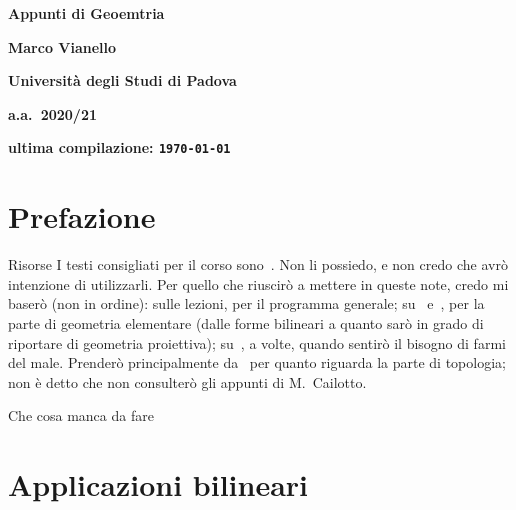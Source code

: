 \documentclass[a4paper]{amsproc}
\makeatletter
\theoremstyle{plain}
\theoremstyle{definition}
\theoremstyle{remark}
\def\paragraph{\@startsection{paragraph}{4}%
  \z@\z@{-\fontdimen2\font}%
  {\normalfont\bfseries}}
\makeatother
\begin{document}
\begin{titlepage}
  \centering
  \vfill
  {\Large\bfseries Appunti di Geoemtria\par}
  \vspace{.6cm}
  {\bfseries Marco Vianello\par}
  \vspace{.2cm}
  {\bfseries Università degli Studi di Padova\par}
  \vspace{.2cm}
  {\bfseries a.a.\ 2020/21\par}
  \vfill
  {\small\bfseries ultima compilazione: \texttt{\today}\par}
\end{titlepage}


\tableofcontents
\clearpage


\section*{Prefazione}
\lipsum[1]
\smallskip

\paragraph{Risorse}
I testi consigliati per il corso sono~\cite{sernesi2000geometria,sernesi2019geometria}. Non li possiedo, e non credo che avrò intenzione di utilizzarli. Per quello che riuscirò a mettere in queste note, credo mi baserò (non in ordine): sulle lezioni, per il programma generale; su~\cite{candilera2011algebra} e~\cite{barsotti1970appunti}, per la parte di geometria elementare (dalle forme bilineari a quanto sarò in grado di riportare di geometria proiettiva); su~\cite{suetin1997linear}, a volte, quando sentirò il bisogno di farmi del male. Prenderò principalmente da~\cite{manetti2014topologia} per quanto riguarda la parte di topologia; non è detto che non consulterò gli appunti di M.\ Cailotto.
\smallskip

\paragraph{Che cosa manca da fare}



\smallskip
\clearpage



\section{Applicazioni bilineari}

\clearpage
\printbibliography[] %
\end{document}
